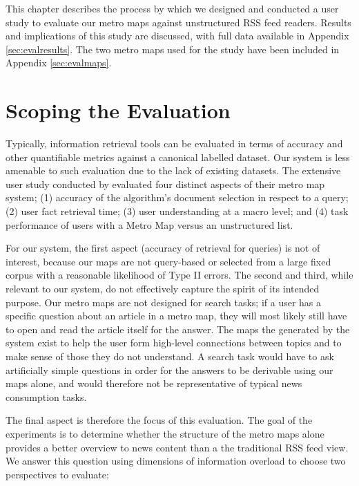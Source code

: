 This chapter describes the process by which we designed and conducted a user study to evaluate our metro maps against unstructured RSS feed readers. Results and implications of this study are discussed, with full data available in Appendix \ref{sec:evalresults}. The two metro maps used for the study have been included in Appendix  \ref{sec:evalmaps}.

\section{Scoping the Evaluation}

Typically, information retrieval tools can be evaluated in terms of  accuracy and other quantifiable metrics against a canonical labelled dataset. Our system is less amenable to such evaluation due to the lack of existing datasets. The extensive user study conducted by \cite{GeneratingInformationMaps} evaluated four distinct aspects of their metro map system; (1) accuracy of the algorithm's document selection in respect to a query; (2) user fact retrieval time; (3) user understanding at a macro level; and (4) task performance of users with a Metro Map versus an unstructured list.

For our system, the first aspect (accuracy of retrieval for queries) is not of interest, because our maps are not query-based or selected from a large fixed corpus with a reasonable likelihood of Type II errors. The second and third, while relevant to our system, do not effectively capture the spirit of its intended purpose. Our metro maps are not designed for search tasks; if a user has a specific question about an article in a metro map, they will most likely still have to open and read the article itself for the answer. The maps the generated by the system exist to help the user form high-level connections between topics and to make sense of those they do not understand. A search task would have to ask artificially simple questions in order for the answers to be derivable using our maps alone, and would therefore not be representative of typical news consumption tasks.

The final aspect is therefore the focus of this evaluation. The goal of the experiments is to determine whether the structure of the metro maps alone provides a better overview to news content than a the traditional RSS feed view. We answer this question using  dimensions of information overload to choose two perspectives to evaluate:

